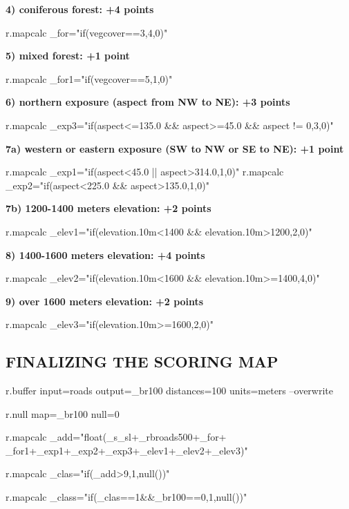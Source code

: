 \textbf{
4) coniferous forest: +4 points}
\begin{smallverbatim}
r.mapcalc _for="if(vegcover==3,4,0)"
\end{smallverbatim}

\textbf{
5) mixed forest: +1 point}
\begin{smallverbatim}
r.mapcalc _for1="if(vegcover==5,1,0)"
\end{smallverbatim}

\textbf{
6) northern exposure (aspect from NW to NE): +3 points}
\begin{smallverbatim}
r.mapcalc _exp3="if(aspect<=135.0 && aspect>=45.0
 && aspect != 0,3,0)"
\end{smallverbatim}

\textbf{
7a) western or eastern exposure (SW to NW or SE to NE): +1 point}
\begin{smallverbatim}
r.mapcalc _exp1="if(aspect<45.0 || aspect>314.0,1,0)"
r.mapcalc _exp2="if(aspect<225.0 && aspect>135.0,1,0)"
\end{smallverbatim}

\textbf{
7b) 1200-1400 meters elevation: +2 points}
\begin{smallverbatim}
r.mapcalc _elev1="if(elevation.10m<1400
 && elevation.10m>1200,2,0)"
\end{smallverbatim}

\textbf{
8) 1400-1600 meters elevation: +4 points}
\begin{smallverbatim}
r.mapcalc _elev2="if(elevation.10m<1600
 && elevation.10m>=1400,4,0)"
\end{smallverbatim}

\textbf{
9) over 1600 meters elevation: +2 points}
\begin{smallverbatim}
r.mapcalc _elev3="if(elevation.10m>=1600,2,0)"
\end{smallverbatim}

\subsection{FINALIZING THE SCORING MAP}

\begin{smallverbatim}
r.buffer input=roads output=_br100
 distances=100 units=meters --overwrite

r.null map=_br100 null=0

r.mapcalc _add="float(_s_sl+_rbroads500+_for+
 _for1+_exp1+_exp2+_exp3+_elev1+_elev2+_elev3)"

r.mapcalc _clas="if(_add>9,1,null())"

r.mapcalc _class="if(_clas==1&&_br100==0,1,null())"
\end{smallverbatim}

